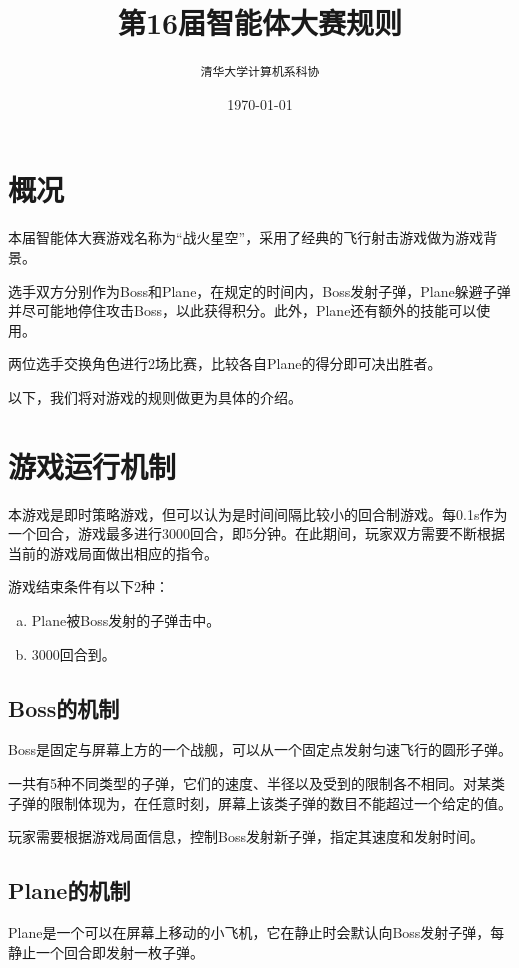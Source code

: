 \documentclass[11pt,a4paper]{article}
\begin{document}
\title{\textbf{第16届智能体大赛规则}}
\author{\texttt{清华大学计算机系科协}}
\date{\today}
\maketitle
\thispagestyle{empty}

\section{概况}
本届智能体大赛游戏名称为``战火星空''，采用了经典的飞行射击游戏做为游戏背景。

选手双方分别作为Boss和Plane，在规定的时间内，Boss发射子弹，Plane躲避子弹并尽可能地停住攻击Boss，以此获得积分。此外，Plane还有额外的技能可以使用。

两位选手交换角色进行2场比赛，比较各自Plane的得分即可决出胜者。

以下，我们将对游戏的规则做更为具体的介绍。

\section{游戏运行机制}
本游戏是即时策略游戏，但可以认为是时间间隔比较小的回合制游戏。每0.1s作为一个回合，游戏最多进行3000回合，即5分钟。在此期间，玩家双方需要不断根据当前的游戏局面做出相应的指令。

游戏结束条件有以下2种：
\begin{enumerate}[(a)]
\item Plane被Boss发射的子弹击中。
\item 3000回合到。
\end{enumerate}

\subsection{Boss的机制}
Boss是固定与屏幕上方的一个战舰，可以从一个固定点发射匀速飞行的圆形子弹。

一共有5种不同类型的子弹，它们的速度、半径以及受到的限制各不相同。对某类子弹的限制体现为，在任意时刻，屏幕上该类子弹的数目不能超过一个给定的值。

玩家需要根据游戏局面信息，控制Boss发射新子弹，指定其速度和发射时间。

\subsection{Plane的机制}
Plane是一个可以在屏幕上移动的小飞机，它在静止时会默认向Boss发射子弹，每静止一个回合即发射一枚子弹。
\end{document}

